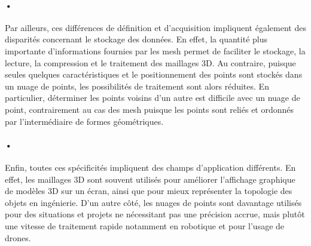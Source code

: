 \paragraph{•} Par ailleurs, ces différences de définition et d'acquisition impliquent également des disparités concernant le stockage des données. En effet, la quantité plus importante d'informations fournies par les mesh permet de faciliter le stockage, la lecture, la compression et le traitement des maillages 3D. Au contraire, puisque seules quelques caractéristiques et le positionnement des points sont stockés dans un nuage de points, les possibilités de traitement sont alors réduites. En particulier, déterminer les points voisins d'un autre est difficile avec un nuage de point, contrairement au cas des mesh puisque les points sont reliés et ordonnés par l'intermédiaire de formes géométriques.

\paragraph{•} Enfin, toutes ces spécificités impliquent des champs d'application différents. En effet, les maillages 3D sont souvent utilisés  pour améliorer l'affichage graphique de modèles 3D sur un écran, ainsi que pour mieux représenter la topologie des objets en ingénierie. D'un autre côté, les nuages de points sont davantage utilisés pour des situations et projets ne nécessitant pas une précision accrue, mais plutôt une vitesse de traitement rapide notamment en robotique et pour l'usage de drones.

